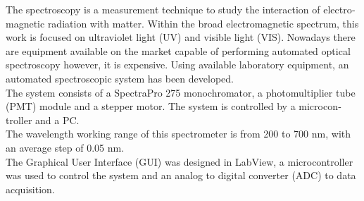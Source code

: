 \begin{otherlanguage}{english}
The spectroscopy is a measurement technique to study the interaction of electromagnetic radiation with matter.
Within the broad electromagnetic spectrum, this work is focused on ultraviolet light (UV) and visible light (VIS). Nowadays there are equipment available on the market capable of performing automated optical spectroscopy however, it is expensive. Using available  laboratory equipment, an automated spectroscopic system has been developed. \\
The system consists of a SpectraPro 275 monochromator, a photomultiplier tube (PMT) module and a stepper motor. The system is controlled by a microcontroller and a PC. \\
The wavelength working range of this spectrometer is from 200 to 700 nm, with an average step of 0.05 nm. \\
The Graphical User Interface (GUI) was designed in LabView, a microcontroller was used to control the system and an analog to digital converter (ADC) to data acquisition.

\end{otherlanguage}{}